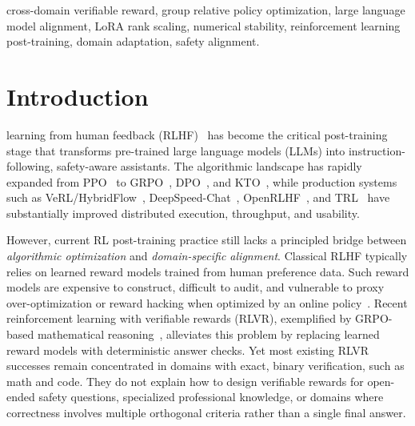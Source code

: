 \documentclass{ieeeaccess}
\begin{document}
\begin{keywords}
cross-domain verifiable reward, group relative policy optimization,
large language model alignment, LoRA rank scaling, numerical stability,
reinforcement learning post-training, domain adaptation, safety alignment.
\end{keywords}

\titlepgskip=-21pt
\maketitle


\section{Introduction}
\label{sec:introduction}
 learning from human feedback
(RLHF)~\cite{christiano2017deep,ouyang2022training} has become the
critical post-training stage that transforms pre-trained large language
models (LLMs) into instruction-following, safety-aware assistants.
The algorithmic landscape has rapidly expanded from PPO~\cite{schulman2017proximal}
to GRPO~\cite{shao2024deepseekmath}, DPO~\cite{rafailov2024direct},
and KTO~\cite{ethayarajh2024kto}, while production systems such as
VeRL/HybridFlow~\cite{sheng2024hybridflow}, DeepSpeed-Chat~\cite{yao2023deepspeed},
OpenRLHF~\cite{hu2024openrlhf}, and TRL~\cite{vonwerra2022trl}
have substantially improved distributed execution, throughput, and usability.

However, current RL post-training practice still lacks a principled bridge
between \emph{algorithmic optimization} and \emph{domain-specific alignment}.
Classical RLHF typically relies on learned reward models trained from human
preference data.  Such reward models are expensive to construct, difficult
to audit, and vulnerable to proxy over-optimization or reward hacking when
optimized by an online policy~\cite{rafailov2024rewardoveropt}.  Recent
reinforcement learning with verifiable rewards (RLVR), exemplified by
GRPO-based mathematical reasoning~\cite{shao2024deepseekmath}, alleviates
this problem by replacing learned reward models with deterministic answer
checks.  Yet most existing RLVR successes remain concentrated in domains
with exact, binary verification, such as math and code.  They do not explain
how to design verifiable rewards for open-ended safety questions, specialized
professional knowledge, or domains where correctness involves multiple
orthogonal criteria rather than a single final answer.
\end{document}
